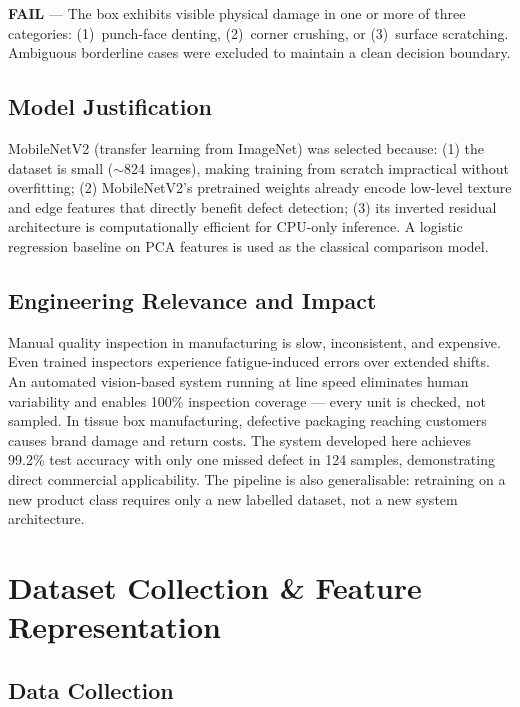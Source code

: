 \documentclass[10pt,twocolumn]{article}
\begin{document}
\textbf{FAIL} --- The box exhibits visible physical damage in one or more of three categories: (1)~punch-face denting, (2)~corner crushing, or (3)~surface scratching. Ambiguous borderline cases were excluded to maintain a clean decision boundary.

\subsection*{Model Justification}

MobileNetV2 (transfer learning from ImageNet) was selected because: (1) the dataset is small ($\sim$824 images), making training from scratch impractical without overfitting; (2) MobileNetV2's pretrained weights already encode low-level texture and edge features that directly benefit defect detection; (3) its inverted residual architecture is computationally efficient for CPU-only inference. A logistic regression baseline on PCA features is used as the classical comparison model.

\subsection*{Engineering Relevance and Impact}

Manual quality inspection in manufacturing is slow, inconsistent, and expensive. Even trained inspectors experience fatigue-induced errors over extended shifts. An automated vision-based system running at line speed eliminates human variability and enables 100\% inspection coverage --- every unit is checked, not sampled. In tissue box manufacturing, defective packaging reaching customers causes brand damage and return costs. The system developed here achieves 99.2\% test accuracy with only one missed defect in 124 samples, demonstrating direct commercial applicability. The pipeline is also generalisable: retraining on a new product class requires only a new labelled dataset, not a new system architecture.

\section{Dataset Collection \& Feature Representation}

\subsection*{Data Collection}
\end{document}
